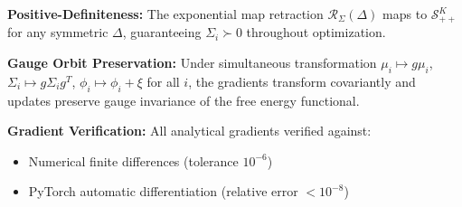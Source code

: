 \documentclass[11pt]{article}
\begin{document}
\textbf{Positive-Definiteness:} The exponential map retraction $\mathcal{R}_{\Sigma}(\Delta)$ maps to $\mathcal{S}_{++}^K$ for any symmetric $\Delta$, guaranteeing $\Sigma_i \succ 0$ throughout optimization.

\textbf{Gauge Orbit Preservation:} Under simultaneous transformation $\mu_i \mapsto g\mu_i$, $\Sigma_i \mapsto g\Sigma_i g^T$, $\phi_i \mapsto \phi_i + \xi$ for all $i$, the gradients transform covariantly and updates preserve gauge invariance of the free energy functional.

\textbf{Gradient Verification:} All analytical gradients verified against:
\begin{itemize}
\item Numerical finite differences (tolerance $10^{-6}$)
\item PyTorch automatic differentiation (relative error $< 10^{-8}$)
\end{itemize}



 

\end{document}
